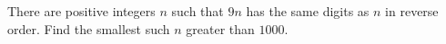 There are positive integers $n$ such that $9n$ has the same digits as $n$ in reverse order. Find the smallest such $n$ greater than $1000$.
